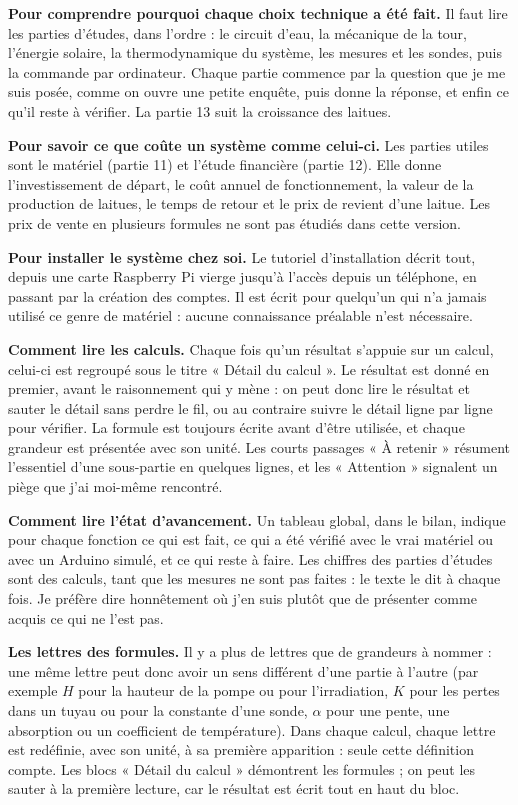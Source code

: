 \documentclass[11pt,a4paper]{article}
\begin{document}
\textbf{Pour comprendre pourquoi chaque choix technique a été fait.} Il faut lire les parties d'études, dans l'ordre : le circuit d'eau, la mécanique de la tour, l'énergie solaire, la thermodynamique du système, les mesures et les sondes, puis la commande par ordinateur. Chaque partie commence par la question que je me suis posée, comme on ouvre une petite enquête, puis donne la réponse, et enfin ce qu'il reste à vérifier. La partie 13 suit la croissance des laitues.

\textbf{Pour savoir ce que coûte un système comme celui-ci.} Les parties utiles sont le matériel (partie 11) et l'étude financière (partie 12). Elle donne l'investissement de départ, le coût annuel de fonctionnement, la valeur de la production de laitues, le temps de retour et le prix de revient d'une laitue. Les prix de vente en plusieurs formules ne sont pas étudiés dans cette version.

\textbf{Pour installer le système chez soi.} Le tutoriel d'installation décrit tout, depuis une carte Raspberry Pi vierge jusqu'à l'accès depuis un téléphone, en passant par la création des comptes. Il est écrit pour quelqu'un qui n'a jamais utilisé ce genre de matériel : aucune connaissance préalable n'est nécessaire.

\textbf{Comment lire les calculs.} Chaque fois qu'un résultat s'appuie sur un calcul, celui-ci est regroupé sous le titre « Détail du calcul ». Le résultat est donné en premier, avant le raisonnement qui y mène : on peut donc lire le résultat et sauter le détail sans perdre le fil, ou au contraire suivre le détail ligne par ligne pour vérifier. La formule est toujours écrite avant d'être utilisée, et chaque grandeur est présentée avec son unité. Les courts passages « À retenir » résument l'essentiel d'une sous-partie en quelques lignes, et les « Attention » signalent un piège que j'ai moi-même rencontré.

\textbf{Comment lire l'état d'avancement.} Un tableau global, dans le bilan, indique pour chaque fonction ce qui est fait, ce qui a été vérifié avec le vrai matériel ou avec un Arduino simulé, et ce qui reste à faire. Les chiffres des parties d'études sont des calculs, tant que les mesures ne sont pas faites : le texte le dit à chaque fois. Je préfère dire honnêtement où j'en suis plutôt que de présenter comme acquis ce qui ne l'est pas.

\textbf{Les lettres des formules.} Il y a plus de lettres que de grandeurs à nommer : une même lettre peut donc avoir un sens différent d'une partie à l'autre (par exemple $H$ pour la hauteur de la pompe ou pour l'irradiation, $K$ pour les pertes dans un tuyau ou pour la constante d'une sonde, $\alpha$ pour une pente, une absorption ou un coefficient de température). Dans chaque calcul, chaque lettre est redéfinie, avec son unité, à sa première apparition : seule cette définition compte. Les blocs « Détail du calcul » démontrent les formules ; on peut les sauter à la première lecture, car le résultat est écrit tout en haut du bloc.
\end{document}
